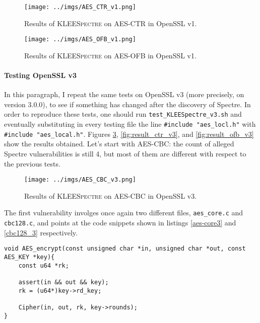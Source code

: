 \documentclass[12pt,a4paper]{book}
\theoremstyle{definition}
\begin{document}
	\begin{figure}[!ht]
		\centering
		\texttt{[image: ../imgs/AES\_CTR\_v1.png]}
		\captionsetup{width=.8\linewidth}
		\caption{Results of \textsc{KLEESpectre} on AES-CTR in OpenSSL v1.}
		\label{fig:result_ctr_v1} 
	\end{figure}

	\begin{figure}[!ht]
		\centering
		\texttt{[image: ../imgs/AES\_OFB\_v1.png]}
		\captionsetup{width=.8\linewidth}
		\caption{Results of \textsc{KLEESpectre} on AES-OFB in OpenSSL v1.}
		\label{fig:result_ofb_v1}
	\end{figure}

	\paragraph{Testing OpenSSL v3} In this paragraph, I repeat the same tests on OpenSSL v3 (more precisely, on version 3.0.0), to see if something has changed after the discovery of Spectre. In order to reproduce these tests, one should run \texttt{test\_KLEESpectre\_v3.sh} and eventually substituting in every testing file the line \texttt{\#include "aes\_locl.h"} with \texttt{\#include "aes\_local.h"}. Figures \ref{fig:result_cbc_v3}, \ref{fig:result_ctr_v3}, and \ref{fig:result_ofb_v3} show the results obtained. Let's start with AES-CBC: the count of alleged Spectre vulnerabilities is still 4, but most of them are different with respect to the previous tests.
	
	\begin{figure}[!ht]
		\centering
		\texttt{[image: ../imgs/AES\_CBC\_v3.png]}
		\captionsetup{width=.8\linewidth}
		\caption{Results of \textsc{KLEESpectre} on AES-CBC in OpenSSL v3.}
		\label{fig:result_cbc_v3}
	\end{figure}

	The first vulnerability involges once again two different files, \texttt{aes\_core.c} and \texttt{cbc128.c}, and points at the code snippets shown in listings \ref{aes-core3} and \ref{cbc128_3} respectively.
	
	\begin{minipage}{.9\textwidth}
		\begin{lstlisting}[caption={\texttt{aes\_core.c}}, label=aes-core3]
void AES_encrypt(const unsigned char *in, unsigned char *out, const AES_KEY *key){
	const u64 *rk;
		
	assert(in && out && key);
	rk = (u64*)key->rd_key;
		
	Cipher(in, out, rk, key->rounds);
}
		\end{lstlisting}
	\end{minipage}
	
\end{document}
